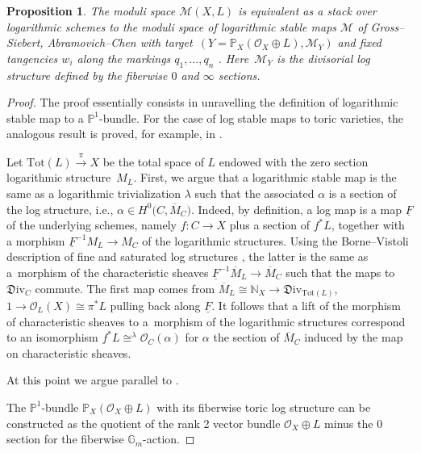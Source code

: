 \documentclass[pdftex]{sigma}
\newcommand{\PP}{\mathbb{P}}
\newcommand{\M}{\mathcal{M}}
\renewcommand{\bar}{\overline}
\numberwithin{equation}{section}
\newtheorem{prop}[theo]{Proposition}
\theoremstyle{definition}
\begin{document}
\begin{prop}\label{prop:logstabelmaps}
The moduli space $\M(X,L)$ is equivalent as a stack over logarithmic schemes to the moduli space of logarithmic stable maps $\M$ of Gross--Siebert, Abramovich--Chen with target~${(Y=\PP_X(\mathcal O_X\oplus L),\mathcal M_Y)}$ and fixed tangencies $w_i$ along the markings $q_1,\dots,q_n$ {\rm\cite{abramovich2014stable,gross2013logarithmic}}. Here~$\mathcal M_Y$ is the divisorial log structure defined by the fiberwise $0$ and $\infty$ sections.
\end{prop}
\begin{proof}
The proof essentially consists in unravelling the definition of logarithmic stable map to a $\mathbb P^1$-bundle. For the case of log stable maps to toric varieties, the analogous result is proved, for example, in \cite[Proposition~2.5.1.1]{RSPW2}.

Let $\mathrm{Tot}(L)\xrightarrow{\pi} X$ be the total space of $L$ endowed with the zero section logarithmic structure~$M_L$. First, we argue that a logarithmic stable map
 is the same as a logarithmic trivialization $\lambda$ such that the associated $\alpha$ is a section of the log structure, i.e., $\alpha\in H^0\bigl(C,\bar{M}_C\bigr)$.
Indeed, by definition, a log map is a map $\underline{F}$ of the underlying schemes, namely $f\colon C\to X$ plus a section of $f^*L$, together with a morphism $\underline{F}^{-1}M_L\to M_C$ of the logarithmic structures. Using the Borne--Vistoli description of fine and saturated log structures \cite{BorneVistoli}, the latter is the same as a~morphism of the characteristic sheaves $\underline{F}^{-1}\bar{M}_L\to \bar{M}_C$ such that the maps to $\mathfrak{D}\mathrm{iv}_C$ commute. The first map comes from
$
 \bar{M}_L\cong\mathbb N_X\to \mathfrak{D}\mathrm{iv}_{\mathrm{Tot}(L)}$, $
1\to \mathcal O_L(X)\cong \pi^* L
$
pulling back along $\underline{F}$. It follows that a lift of the morphism of characteristic sheaves to a~morphism of the logarithmic structures correspond to an isomorphism $f^*L\cong^{\lambda}\mathcal O_C(\alpha)$ for $\alpha$ the section of $\bar{M}_C$ induced by the map on characteristic sheaves.

At this point we argue parallel to \cite[Section~2.5.1]{RSPW2}.

The $\mathbb P^1$-bundle $\mathbb P_X(\mathcal O_X\oplus L)$ with its fiberwise toric log structure can be constructed as the quotient of the rank 2 vector bundle $\mathcal O_X\oplus L$ minus the $0$ section for the fiberwise $\mathbb G_m$-action.


\end{proof}
\end{document}

